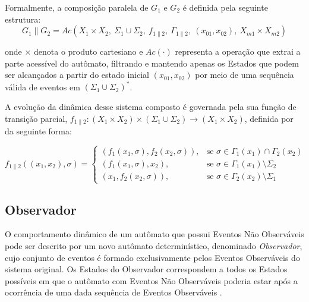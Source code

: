 Formalmente, a composição paralela de $G_1$ e $G_2$ é definida pela seguinte estrutura:
\begin{equation}
	G_1 \parallel G_2 =
	Ac(X_1 \times X_2,\ \Sigma_1 \cup \Sigma_2,\ f_{1 \parallel 2},\ \Gamma_{1 \parallel 2},\ (x_{01},x_{02}),\ X_{m1} \times X_{m2})
	\label{eq:composicao_paralela}
\end{equation}

onde $\times$ denota o produto cartesiano e $Ac(\cdot)$ representa a operação que extrai a parte acessível do autômato, filtrando e mantendo apenas os Estados que podem ser alcançados a partir do estado inicial $(x_{01}, x_{02})$ por meio de uma sequência válida de eventos em $(\Sigma_1 \cup \Sigma_2)^*$.

A evolução da dinâmica desse sistema composto é governada pela sua função de transição parcial, $f_{1 \parallel 2} : (X_1 \times X_2) \times (\Sigma_1 \cup \Sigma_2) \to (X_1 \times X_2)$, definida por \cite{basilio2010} da seguinte forma:

\begin{equation}
	f_{1 \parallel 2}((x_1, x_2), \sigma)=
	\begin{cases}
		(f_1(x_1, \sigma), f_2(x_2, \sigma)), 
		& \text{se } \sigma \in \Gamma_1(x_1) \cap \Gamma_2(x_2)
		\\[6pt]
		(f_1(x_1, \sigma), x_2), 
		& \text{se } \sigma \in \Gamma_1(x_1) \setminus \Sigma_2
		\\[6pt]
		(x_1, f_2(x_2, \sigma)), 
		& \text{se } \sigma \in \Gamma_2(x_2) \setminus \Sigma_1
	\end{cases}
	\label{eq:funcao_transicao_paralela}
\end{equation}

\subsection{Observador}

O comportamento dinâmico de um autômato que possui Eventos Não Observáveis pode ser descrito por um novo autômato determinístico, denominado \textit{Observador}, cujo conjunto de eventos é formado exclusivamente pelos Eventos Observáveis do sistema original. Os Estados do Observador correspondem a todos os Estados possíveis em que o autômato com Eventos Não Observáveis poderia estar após a ocorrência de uma dada sequência de Eventos Observáveis \cite{basilio2010}.


